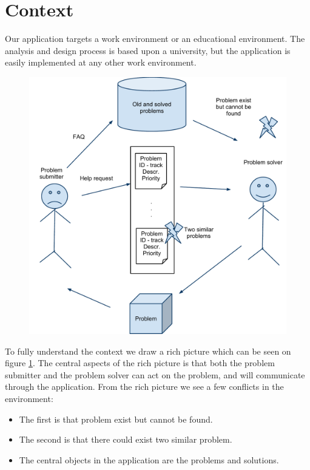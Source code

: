 \section{Context}
Our application targets a work environment or an educational environment.
The analysis and design process is based upon a university, but the application is easily implemented at any other work environment. 

\begin{figure}[h]%
\includegraphics[scale = 0.45]{input/background/rich_picture.pdf}%
%
\label{fig:rich_picture}%
\end{figure}

To fully understand the context we draw a rich picture which can be seen on figure \ref{fig:rich_picture}. 
The central aspects of the rich picture is that both the problem submitter and the problem solver can act on the problem, and will communicate through the application. 
From the rich picture we see a few conflicts in the environment:
\begin{itemize}
		\item The first is that problem exist but cannot be found.
		\item The second is that there could exist two similar problem.
		\item The central objects in the application are the problems and solutions.
\end{itemize} 

